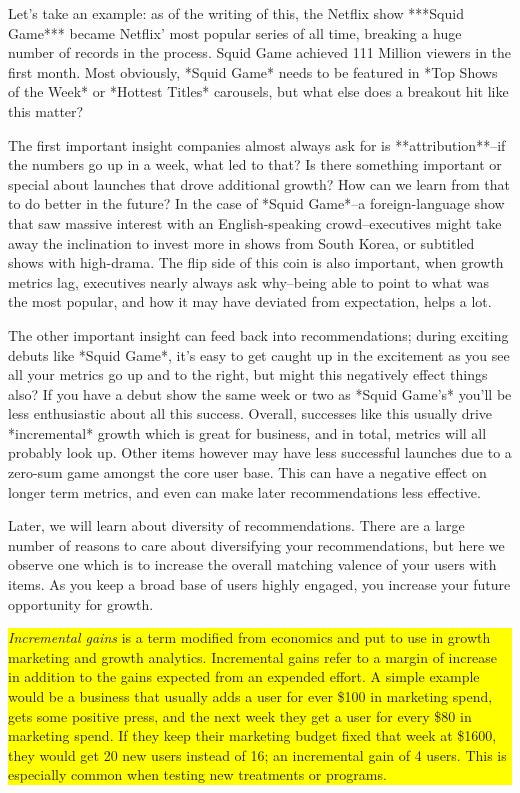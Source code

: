 Let's take an example: as of the writing of this, the Netflix show ***Squid Game*** became Netflix' most popular series of all time, breaking a huge number of records in the process. Squid Game achieved 111 Million viewers in the first month. Most obviously, *Squid Game* needs to be featured in *Top Shows of the Week* or *Hottest Titles* carousels, but what else does a breakout hit like this matter?

The first important insight companies almost always ask for is **attribution**–if the numbers go up in a week, what led to that? Is there something important or special about launches that drove additional growth? How can we learn from that to do better in the future? In the case of *Squid Game*–a foreign-language show that saw massive interest with an English-speaking crowd–executives might take away the inclination to invest more in shows from South Korea, or subtitled shows with high-drama. The flip side of this coin is also important, when growth metrics lag, executives nearly always ask why–being able to point to what was the most popular, and how it may have deviated from expectation, helps a lot.

The other important insight can feed back into recommendations; during exciting debuts like *Squid Game*, it's easy to get caught up in the excitement as you see all your metrics go up and to the right, but might this negatively effect things also? If you have a debut show the same week or two as *Squid Game's* you'll be less enthusiastic about all this success. Overall, successes like this usually drive *incremental* growth which is great for business, and in total, metrics will all probably look up. Other items however may have less successful launches due to a zero-sum game amongst the core user base. This can have a negative effect on longer term metrics, and even can make later recommendations less effective. 

Later, we will learn about diversity of recommendations. There are a large number of reasons to care about diversifying your recommendations, but here we observe one which is to increase the overall matching valence of your users with items. As you keep a broad base of users highly engaged, you increase your future opportunity for growth.

\vspace{10pt}
\colorbox{yellow}{\parbox{\textwidth-20pt}{ \emph{Incremental gains} is a term modified from economics and put to use in growth marketing and growth analytics. Incremental gains refer to a margin of increase in addition to the gains expected from an expended effort. A simple example would be a business that usually adds a user for ever \$100 in marketing spend, gets some positive press, and the next week they get a user for every \$80 in marketing spend. If they keep their marketing budget fixed that week at \$1600, they would get 20 new users instead of 16; an incremental gain of 4 users. This is especially common when testing new treatments or programs.
}}


